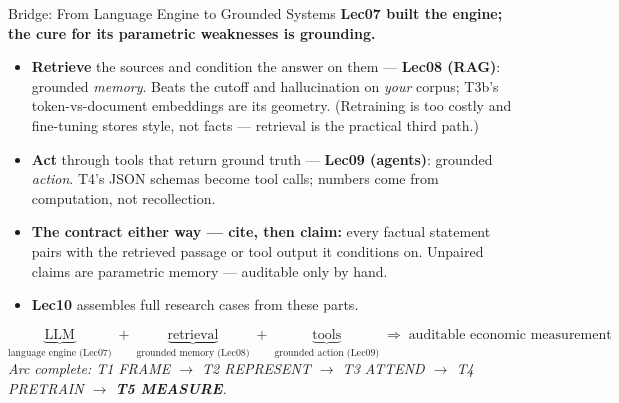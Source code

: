 \begin{frame}{Bridge: From Language Engine to Grounded Systems}
\textbf{Lec07 built the engine; the cure for its parametric weaknesses is grounding.}
\begin{itemize}
\item \textbf{Retrieve} the sources and condition the answer on them --- \textbf{Lec08 (RAG)}: grounded \emph{memory}. Beats the cutoff and hallucination on \emph{your} corpus; T3b's token-vs-document embeddings are its geometry. (Retraining is too costly and fine-tuning stores style, not facts --- retrieval is the practical third path.)
\item \textbf{Act} through tools that return ground truth --- \textbf{Lec09 (agents)}: grounded \emph{action}. T4's JSON schemas become tool calls; numbers come from computation, not recollection.
\item \textbf{The contract either way --- cite, then claim:} every factual statement pairs with the retrieved passage or tool output it conditions on. Unpaired claims are parametric memory --- auditable only by hand.
\item \textbf{Lec10} assembles full research cases from these parts.
\end{itemize}
\medskip
\[
   \underbrace{\text{LLM}}_{\text{language engine (Lec07)}}
   \;+\;\underbrace{\text{retrieval}}_{\text{grounded memory (Lec08)}}
   \;+\;\underbrace{\text{tools}}_{\text{grounded action (Lec09)}}
   \;\Rightarrow\;\text{auditable economic measurement}
\]
\smallskip
\centering\footnotesize\textit{Arc complete: T1 FRAME $\to$ T2 REPRESENT $\to$ T3 ATTEND $\to$ T4 PRETRAIN $\to$ \textbf{T5 MEASURE}.}
\end{frame}


